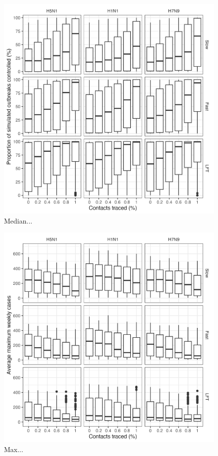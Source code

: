 \documentclass{article}
\begin{document}
\begin{figure}[ht]
\centering
\includegraphics[width=\textwidth]{../plots/prop_controlled_outbreak.png}
\caption{Median...}
\label{fig:prop-controlled-outbreak}
\end{figure}

\begin{figure}[ht]
\centering
\includegraphics[width=\textwidth]{../plots/max_weekly_cases.png}
\caption{Max...}
\label{fig:max-weekly-cases}
\end{figure}
\end{document}

